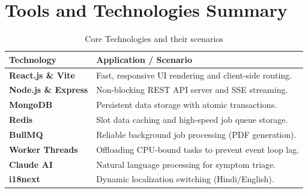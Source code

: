 \documentclass[12pt, a4paper]{article}
\begin{document}
\section{Tools and Technologies Summary}
\begin{table}[H]
    \centering
    \begin{tabular}{@{}ll@{}}
        \toprule
        \textbf{Technology} & \textbf{Application / Scenario} \\ \midrule
        \textbf{React.js \& Vite} & Fast, responsive UI rendering and client-side routing. \\
        \textbf{Node.js \& Express} & Non-blocking REST API server and SSE streaming. \\
        \textbf{MongoDB} & Persistent data storage with atomic transactions. \\
        \textbf{Redis} & Slot data caching and high-speed job queue storage. \\
        \textbf{BullMQ} & Reliable background job processing (PDF generation). \\
        \textbf{Worker Threads} & Offloading CPU-bound tasks to prevent event loop lag. \\
        \textbf{Claude AI} & Natural language processing for symptom triage. \\
        \textbf{i18next} & Dynamic localization switching (Hindi/English). \\ \bottomrule
    \end{tabular}
    \caption{Core Technologies and their scenarios}
\end{table}
\end{document}
